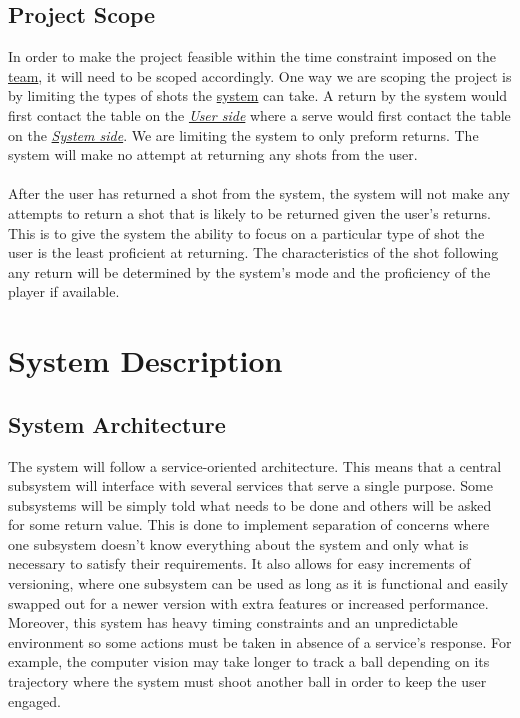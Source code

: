 \documentclass[11pt]{article}
\begin{document}
\subsection{Project Scope}
In order to make the project feasible within the time constraint imposed on the \hyperref[sec:definitions]{team}, it will need to be scoped accordingly. One way we are scoping the project is by limiting the types of shots the \hyperref[sec:definitions]{system} can take. A return by the system would first contact the table on the \hyperref[sec:definitions]{\textit{User side}} where a serve would first contact the table on the \hyperref[sec:definitions]{\textit{System side}}. We are limiting the system to only preform returns. The system will make no attempt at returning any shots from the user. \\\\
After the user has returned a shot from the system, the system will not make any attempts to return a shot that is likely to be returned given the user's returns. This is to give the system the ability to focus on a particular type of shot the user is the least proficient at returning. The characteristics of the shot following any return will be determined by the system's mode and the proficiency of the player if available.
\section{System Description}
\subsection{System Architecture}
The system will follow a service-oriented architecture. This means that a central subsystem will interface with several services that serve a single purpose. Some subsystems will be simply told what needs to be done and others will be asked for some return value. This is done to implement separation of concerns where one subsystem doesn't know everything about the system and only what is necessary to satisfy their requirements. It also allows for easy increments of versioning, where one subsystem can be used as long as it is functional and easily swapped out for a newer version with extra features or increased performance. Moreover, this system has heavy timing constraints and an unpredictable environment so some actions must be taken in absence of a service's response. For example, the computer vision may take longer to track a ball depending on its trajectory where the system must shoot another ball in order to keep the user engaged.
\end{document}
